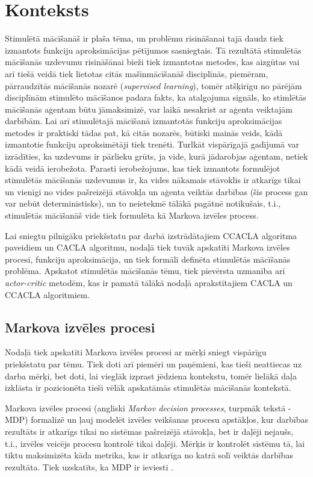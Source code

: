 \documentclass{ludis} %
\begin{document}
\chapter{Konteksts}
Stimulētā mācīšanāš ir plaša tēma, un problēmu risināšanai tajā daudz tiek
izmantots funkciju aproksimācijas pētījumos sasniegtais. Tā rezultātā stimulētās
mācīšanās uzdevumu risināšānai bieži tiek izmantotas metodes, kas aizgūtas vai
arī tiešā veidā tiek lietotas citās mašīnmācīšanāš disciplīnās, piemēram,
pārraudzītās mācīšanās nozarē (\textit{supervised learning}), tomēr atšķirīgu
no pārējām disciplīnām stimulēto mācīšanos padara fakts, ka atalgojuma signāls,
ko stimlētās mācīšanās aģentam būtu jāmaksimizē, var laikā nesakrist ar aģenta
veiktajām darbībām. Lai arī stimulētajā mācīšanā izmantotās funkciju
aproksimācijas metodes ir praktiski tādas pat, kā citās nozarēs, būtiski mainās
veids, kādā izmantotie funkciju aproksimētāji tiek trenēti. Turlkāt vispārīgajā
gadījumā var izrādīties, ka uzdevums ir pārlieku grūts, ja vide, kurā jādarobjas
aģentam, netiek kādā veidā ierobežota. Parasti ierobežojums, kas tiek izmantots
formulējot stimulētās mācīšanās uzdevumus ir, ka vides nākamais stāvoklis ir
atkarīgs tikai un vienīgi no vides pašreizējā stāvokļa un aģenta veiktās
darbības (šis process gan var nebūt deterministisks), un to neietekmē tālākā
pagātnē notikušais, t.i., stimulētās mācīšanāš vide tiek formulēta kā Markova
izvēles process.

Lai sniegtu pilnīgāku priekšstatu par darbā izstrādātajiem CCACLA algoritma
paveidiem un CACLA algoritmu, nodaļā tiek tuvāk apskatīti Markova izvēles
procesi, funkciju aproksimācija, un tiek formāli definēta stimulētās mācīšanās
problēma. Apskatot stimulētās mācīšanās tēmu, tiek pievērsta uzmanība arī
\textit{actor-critic} metodēm, kas ir pamatā tālākā nodaļā aprakstītajiem CACLA
un CCACLA algoritmiem.
\section{Markova izvēles procesi} \label{sec:mdp}
Nodaļā tiek apskatīti Markova izvēles procesi ar mērķi sniegt vispārīgu
priekšstatu par tēmu. Tiek doti arī piemēri un paņēmieni, kas tieši neattiecas
uz darba mērķi, bet doti, lai vieglāk izprast jēdziena kontekstu, tomēr lielākā
daļa izklāsta ir pozicionēta tieši vēlāk apskatāmās stimulētās mācīšanās
kontekstā.

Markova izvēles procesi (angliski \textit{Markov decision processes}, turpmāk
tekstā - MDP) formalizē un ļauj modelēt izvēles veikšanas procesu apstākļos, kur
darbības rezultāts ir atkarīgs tikai no sistēmas pašreizējā stāvokļa, bet ir
daļēji nejaušs, t.i., izvēles veicējs procesu kontrolē tikai daļēji. Mērķis ir
kontrolēt sistēmu tā, lai tiktu maksimizēta kāda metrika, kas ir atkarīga no
katrā solī veiktās darbības rezultāta. Tiek uzskatīts, ka MDP ir ieviesti
\autocite{Bel}.
\end{document}
